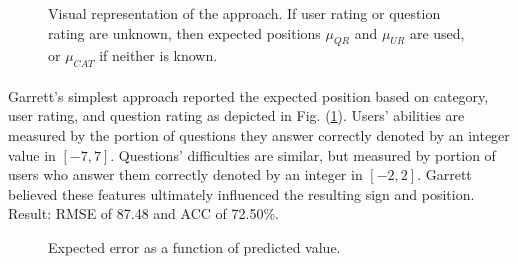 \documentclass[letterpaper]{article}
\begin{document}
\begin{figure}[H]
	\begin{center}
	\end{center}
	\caption{Visual representation of the approach. If user rating or question rating are unknown, then expected positions $\mu_{QR}$ and $\mu_{UR}$ are used, or $\mu_{CAT}$ if neither is known.}
	\label{fig:expectedValue}
\end{figure}

\paragraph{} Garrett's simplest approach reported the expected position based on category, user rating, and question rating as depicted in Fig. (\ref{fig:expectedValue}). Users' abilities are measured by the portion of questions they answer correctly denoted by an integer value in $[-7, 7]$. Questions' difficulties are similar, but measured by portion of users who answer them correctly denoted by an integer in $[-2, 2]$. Garrett believed these features ultimately influenced the resulting sign and position. Result: RMSE of 87.48 and ACC of 72.50\%.

\begin{figure}[H]
	\begin{center}
	\end{center}
	\caption{Expected error as a function of predicted value.}
	\label{fig:expectedValue:errorAnalysis}
\end{figure}
\end{document}

